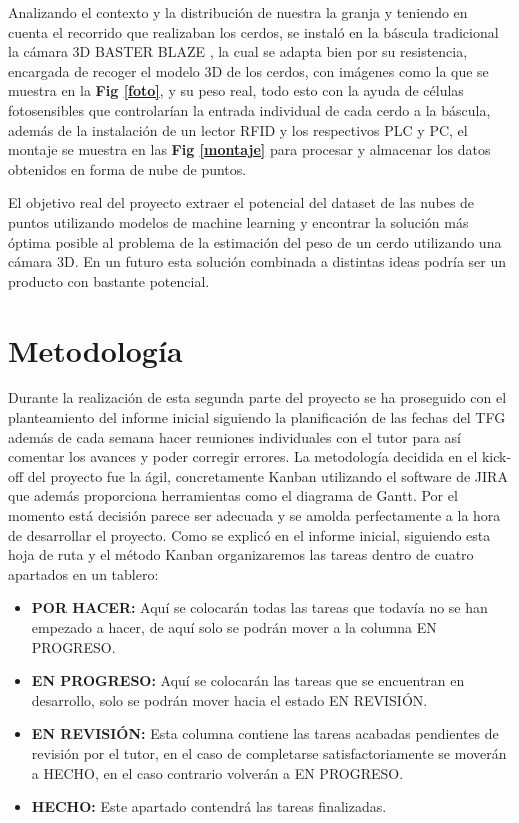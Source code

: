 \documentclass[12pt,a4paper]{article}
\begin{document}
Analizando el contexto y la distribución de nuestra la granja y teniendo en cuenta el recorrido que realizaban los cerdos, se instaló en la báscula tradicional la cámara 3D BASTER BLAZE \cite{camara}, la cual se adapta bien por su resistencia, encargada de recoger el modelo 3D de los cerdos, con imágenes como la que se muestra en la \textbf{Fig \ref{foto}}, y su peso real, todo esto con la ayuda de células fotosensibles que controlarían la entrada individual de cada cerdo a la báscula, además de la instalación de un lector RFID y los respectivos PLC y PC, el montaje se muestra en las \textbf{Fig \ref{montaje}} para procesar y almacenar los datos obtenidos en forma de nube de puntos.


El objetivo real del proyecto extraer el potencial del dataset de las nubes de puntos utilizando modelos de machine learning y encontrar la solución más óptima posible al problema de la estimación del peso de un cerdo utilizando una cámara 3D. En un futuro esta solución combinada a distintas ideas podría ser un producto con bastante potencial.







\section{Metodología}

Durante la realización de esta segunda parte del proyecto se ha proseguido con el planteamiento del informe inicial siguiendo la planificación de las fechas del TFG además de cada semana hacer reuniones individuales con el tutor para así comentar los avances y poder corregir errores. La metodología decidida en el kick-off del proyecto fue la ágil, concretamente Kanban utilizando el software de JIRA \cite{JIRA} que además proporciona herramientas como el diagrama de Gantt. Por el momento está decisión parece ser adecuada y se amolda perfectamente a la hora de desarrollar el proyecto. Como se explicó en el informe inicial, siguiendo esta hoja de ruta y el método Kanban organizaremos las tareas dentro de cuatro apartados en un tablero:



\begin{itemize}
  \item \textbf{POR HACER: }Aquí se colocarán todas las tareas que todavía no se han empezado a hacer, de aquí solo se podrán mover a la columna EN PROGRESO.
  \item \textbf{EN PROGRESO: }Aquí se colocarán las tareas que se encuentran en desarrollo, solo se podrán mover hacia el estado EN REVISIÓN.
  \item \textbf{EN REVISIÓN: }Esta columna contiene las tareas acabadas pendientes de revisión por el tutor, en el caso de completarse satisfactoriamente se moverán a HECHO, en el caso contrario volverán a EN PROGRESO.
  \item \textbf{HECHO: }Este apartado contendrá las tareas finalizadas.
\end{itemize}
\end{document}
